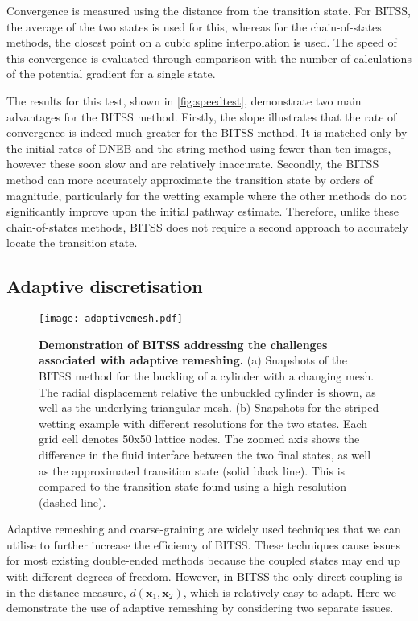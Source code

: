 \documentclass[twocolumn,10pt]{revtex4}
\newcommand{\bm}[1]{\boldsymbol{\mathbf{#1}}}
\begin{document}
Convergence is measured using the distance from the transition state.
For BITSS, the average of the two states is used for this, whereas for the chain-of-states methods, the closest point on a cubic spline interpolation is used.
The speed of this convergence is evaluated through comparison with the number of calculations of the potential gradient for a single state.

The results for this test, shown in \cref{fig:speedtest}, demonstrate two main advantages for the BITSS method.
Firstly, the slope illustrates that the rate of convergence is indeed much greater for the BITSS method.
It is matched only by the initial rates of DNEB and the string method using fewer than ten images, however these soon slow and are relatively inaccurate.
Secondly, the BITSS method can more accurately approximate the transition state by orders of magnitude, particularly for the wetting example where the other methods do not significantly improve upon the initial pathway estimate.
Therefore, unlike these chain-of-states methods, BITSS does not require a second approach to accurately locate the transition state.


\subsection{Adaptive discretisation}\label{sec:adaptive}
\begin{figure}[tb]
  \texttt{[image: adaptivemesh.pdf]}
  \caption{\label{fig:adaptivemesh}
    \textbf{Demonstration of BITSS addressing the challenges associated with adaptive remeshing.}
    (a) Snapshots of the BITSS method for the buckling of a cylinder with a changing mesh.
        The radial displacement relative the unbuckled cylinder is shown, as well as the underlying triangular mesh.
    (b) Snapshots for the striped wetting example with different resolutions for the two states.
        Each grid cell denotes 50x50 lattice nodes.
        The zoomed axis shows the difference in the fluid interface between the two final states, as well as the approximated transition state (solid black line).
        This is compared to the transition state found using a high resolution (dashed line).
  }
\end{figure}

Adaptive remeshing and coarse-graining are widely used techniques that we can utilise to further increase the efficiency of BITSS.
These techniques cause issues for most existing double-ended methods because the coupled states may end up with different degrees of freedom.
However, in BITSS the only direct coupling is in the distance measure, $d(\bm{x}_1,\bm{x}_2)$, which is relatively easy to adapt.
Here we demonstrate the use of adaptive remeshing by considering two separate issues.
\end{document}
